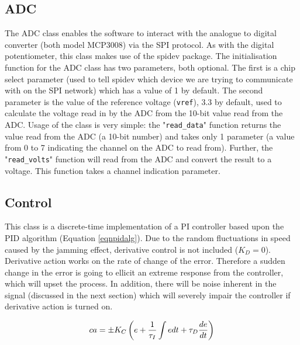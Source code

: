\documentclass[twoside,a4]{report}
\def\br{\newline \newline \noindent}
\begin{document}
	\subsection*{ADC} %
	The ADC class enables the software to interact with the analogue to digital converter (both model MCP3008) via the SPI protocol. As with the digital potentiometer, this class makes use of the spidev package. \br
	The initialisation function for the ADC class has two parameters, both optional. The first is a chip select parameter (used to tell spidev which device we are trying to communicate with on the SPI network) which has a value of 1 by default. The second parameter is the value of the reference voltage (\texttt{vref}), 3.3 by default, used to calculate the voltage read in by the ADC from the 10-bit value read from the ADC. \br
	Usage of the class is very simple: the "\texttt{read\_data}" function returns the value read from the ADC (a 10-bit number) and takes only 1 parameter (a value from 0 to 7 indicating the channel on the ADC to read from). Further, the "\texttt{read\_volts}" function will read from the ADC and convert the result to a voltage. This function takes a channel indication parameter.
	
	\subsection*{Control} %
	This class is a discrete-time implementation of a PI controller based upon the PID algorithm (Equation \ref{eqnpidalg}). Due to the random fluctuations in speed caused by the jamming effect, derivative control is not included ($K_D = 0$). Derivative action works on the rate of change of the error. Therefore a sudden change in the error is going to ellicit an extreme response from  the controller, which will upset the process. In addition, there will be noise inherent in the signal (discussed in the next section) which will severely impair the controller if derivative action is turned on. 
	
	\begin{equation}
		ca = \pm K_C \left(e + \frac{1}{\tau _I} \int e \space dt + \tau _D \frac{de}{dt}\right)
		\label{eqnpidalg}
	\end{equation}
	
	
\end{document}
